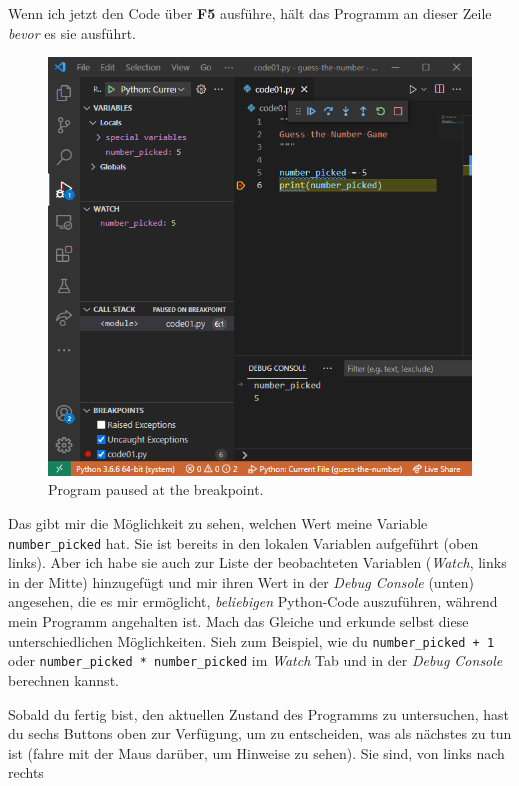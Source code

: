 \documentclass[
]{book}
\begin{document}
Wenn ich jetzt den Code über \textbf{F5} ausführe, hält das Programm an dieser Zeile \emph{bevor} es sie ausführt.

\begin{figure}
\centering
\includegraphics{images/debug-pause.png}
\caption{Program paused at the breakpoint.}
\end{figure}

Das gibt mir die Möglichkeit zu sehen, welchen Wert meine Variable \texttt{number\_picked} hat. Sie ist bereits in den lokalen Variablen aufgeführt (oben links). Aber ich habe sie auch zur Liste der beobachteten Variablen (\emph{Watch}, links in der Mitte) hinzugefügt und mir ihren Wert in der \emph{Debug Console} (unten) angesehen, die es mir ermöglicht, \emph{beliebigen} Python-Code auszuführen, während mein Programm angehalten ist. Mach das Gleiche und erkunde selbst diese unterschiedlichen Möglichkeiten. Sieh zum Beispiel, wie du \texttt{number\_picked\ +\ 1} oder \texttt{number\_picked\ *\ number\_picked} im \emph{Watch} Tab und in der \emph{Debug Console} berechnen kannst.

Sobald du fertig bist, den aktuellen Zustand des Programms zu untersuchen, hast du sechs Buttons oben zur Verfügung, um zu entscheiden, was als nächstes zu tun ist (fahre mit der Maus darüber, um Hinweise zu sehen). Sie sind, von links nach rechts
\end{document}
